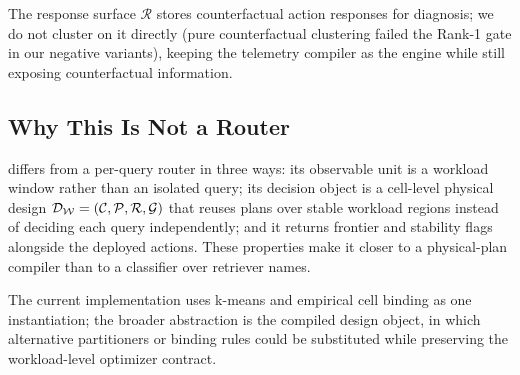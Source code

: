 The response surface $\mathcal{R}$ stores counterfactual action responses for diagnosis; we do not cluster on it directly (pure counterfactual clustering failed the Rank-1 gate in our negative variants), keeping the telemetry compiler as the engine while still exposing counterfactual information.

\subsection{Why This Is Not a Router}

\WCR{} differs from a per-query router in three ways: its observable unit is a workload window rather than an isolated query; its decision object is a cell-level physical design $\mathcal{D}_{\mathcal{W}}=(\mathcal{C},\mathcal{P},\mathcal{R},\mathcal{G})$ that reuses plans over stable workload regions instead of deciding each query independently; and it returns frontier and stability flags alongside the deployed actions. These properties make it closer to a physical-plan compiler than to a classifier over retriever names.

The current implementation uses k-means and empirical cell binding as one instantiation; the broader abstraction is the compiled design object, in which alternative partitioners or binding rules could be substituted while preserving the workload-level optimizer contract.
